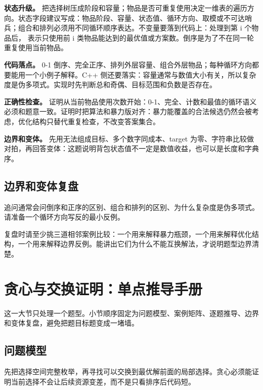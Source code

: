 \textbf{状态升级。} 把选择树压成阶段和容量；物品是否可重复使用决定一维表的遍历方向。状态字段建议写成：物品阶段、容量、状态值、循环方向、取模或不可达哨兵；组合和排列必须用不同循环顺序表达。不变量要落到代码上：处理到第 i 个物品后， 表示只使用前 i 类物品能达到的最优值或方案数。倒序是为了不在同一轮重复使用当前物品。

\textbf{代码落点。} 0-1 倒序、完全正序、排列外层容量、组合外层物品；每种循环方向都要能用一个小例子解释。C++ 侧还要落实：容量通常与数值大小有关，所以复杂度是伪多项式。实现时先判断总和奇偶、目标范围和负数是否存在。

\textbf{正确性检查。} 证明从当前物品使用次数开始：0-1、完全、计数和最值的循环语义必须和题意一致。证明时把算法和暴力版对齐：暴力能覆盖的合法候选仍然会被考虑，优化结构只替代重复检查，不改变答案集合。

\textbf{边界和变体。} 先用无法组成目标、多个数字同成本、target 为零、字符串比较做对拍，再回答变体：这题说明背包状态值不一定是数值收益，也可以是长度和字典序。

\subsection{边界和变体复盘}

追问通常会问倒序和正序的区别、组合和排列的区别、为什么复杂度是伪多项式。请准备一个循环方向写反的最小反例。

复盘时请至少挑三道相邻案例比较：一个用来解释暴力瓶颈，一个用来解释优化结构，一个用来解释边界反例。能讲出它们为什么不能互换解法，才说明题型边界清楚。

\section{贪心与交换证明：单点推导手册}
这一大节只处理一个题型。小节顺序固定为问题模型、案例矩阵、逐题推导、边界和变体复盘，避免把题目标题变成一堵墙。

\subsection{问题模型}

先把选择空间完整枚举，再寻找可以交换到最优解前面的局部选择。贪心必须能证明当前选择不会让后续资源变差，而不是只看排序后代码短。


